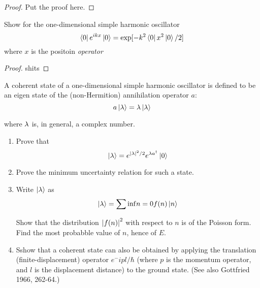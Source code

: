 \begin{proof}

    Put the proof here.

\end{proof}


\begin{exer}[2.18]

    Show for the one-dimensional simple harmonic oscillator
    \[
        \left< 0 \right| e^{ikx} \left| 0 \right> = \exp[- k^2 \left< 0 \right| x^2 \left| 0 \right> / 2]
    \]
    where $x$ is the positoin \it{operator}
    
\end{exer}

\begin{proof}

    shits

\end{proof}


\begin{exer}[2.19]

    A coherent state of a one-dimensional simple harmonic oscillator is
    defined to be an eigen state of the (non-Hermition) annihilation
    operator $a$:
    \[
        a\left| \lambda \right> = \lambda \left| \lambda \right>
    \]
    
    where $\lambda$ is, in general, a complex number.
    \begin{enumerate}
        \item Prove that 
            \[
                \left| \lambda \right> = e^{\left| \lambda \right|^2 / 2} e^{\lambda
                a^\dagger} \left| 0 \right>
            \]

        \item Prove the minimum uncertainty relation for such a state.

        \item Write $\left| \lambda \right>$ as 
            \[
                \left| \lambda \right> = \sum{\inf}{n = 0} f(n) \left| n \right>
            \]

            Show that the distribution $\left| f(n) \right|^2$ with respect to
            $n$ is of the Poisson form. Find the most probabble value of
            $n$, hence of $E$.

        \item Sshow that a coherent state can also be obtained by
            applying the translation (finite-displacement) operator
            $e^-ipl/\hbar$ (where $p$ is the momentum operator, and
            $l$ is the displacement distance) to the ground state. (See
            also Gottfried 1966, 262-64.)

    \end{enumerate}
\end{exer}

